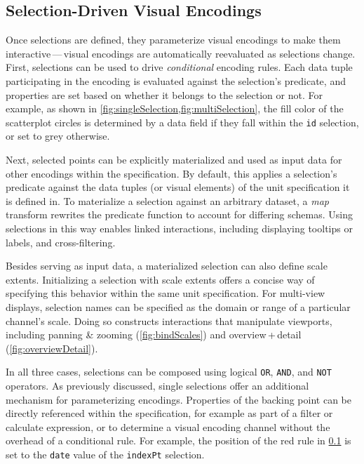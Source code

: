 \subsection{Selection-Driven Visual Encodings}

Once selections are defined, they parameterize visual encodings to make them
interactive\,---\,visual encodings are automatically reevaluated as selections
change. First, selections can be used to drive \emph{conditional} encoding
rules. Each data tuple participating in the encoding is evaluated against the
selection's predicate, and properties are set based on whether it belongs to the
selection or not. For example, as shown in
\cref{fig:singleSelection,fig:multiSelection}, the fill color of the scatterplot
circles is determined by a data field if they fall within the \texttt{id}
selection, or set to grey otherwise.

Next, selected points can be explicitly materialized and used as input data for
other encodings within the specification. By default, this applies a selection's
predicate against the data tuples (or visual elements) of the unit specification
it is defined in. To materialize a selection against an arbitrary dataset, a
\emph{map} transform rewrites the predicate function to account for differing
schemas. Using selections in this way enables linked interactions, including
displaying tooltips or labels, and cross-filtering.

Besides serving as input data, a materialized selection can also define scale
extents. Initializing a selection with scale extents offers a concise way of
specifying this behavior within the same unit specification. For multi-view
displays, selection names can be specified as the domain or range of a
particular channel's scale. Doing so constructs interactions that manipulate
viewports, including panning \& zooming (\cref{fig:bindScales}) and
overview\,+\,detail (\cref{fig:overviewDetail}).

In all three cases, selections can be composed using logical \texttt{OR},
\texttt{AND}, and \texttt{NOT} operators. As previously discussed, single
selections offer an additional mechanism for parameterizing encodings.
Properties of the backing point can be directly referenced within  the
specification, for example as part of a filter or calculate expression, or to
determine a visual encoding channel without the overhead of a conditional rule.
For example, the position of the red rule in \cref{} is set to
the \texttt{date} value of the \texttt{indexPt} selection.


